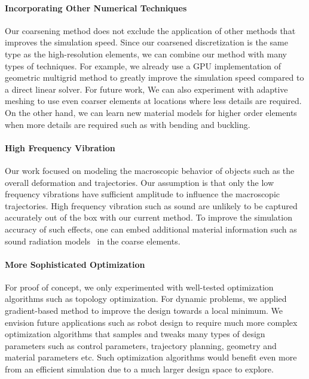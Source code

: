 \paragraph{Incorporating Other Numerical Techniques}
Our coarsening method does not exclude the application of other methods that improves the simulation speed.
Since our coarsened discretization is the same type as the high-resolution elements, we can combine our method with many types of techniques.
For example, we already use a GPU implementation of geometric multigrid method to greatly improve the simulation speed compared to a direct linear solver.
For future work,
We can also experiment with adaptive meshing to use even coarser elements at locations where less details are required. On the other hand, we can learn new material models for higher order elements when more details are required such as with bending and buckling.
\paragraph{High Frequency Vibration}
Our work focused on modeling the macroscopic behavior of objects such as the overall deformation and trajectories.
Our assumption is that only the low frequency vibrations have sufficient amplitude to influence the macroscopic trajectories.
High frequency vibration such as sound are unlikely to be captured accurately out of the box with our current method.
To improve the simulation accuracy of such effects, one can embed additional material information such as sound radiation models~\citep{schweickart2017animating} in the coarse elements.
\paragraph{More Sophisticated Optimization}
For proof of concept, we only experimented with well-tested optimization algorithms such as topology optimization. For dynamic problems, we applied gradient-based method to improve the design towards a local minimum.
We envision future applications such as robot design to require much more complex optimization algorithms that samples and tweaks many types of design parameters such as control parameters, trajectory planning, geometry and material parameters etc.
Such optimization algorithms would benefit even more from an efficient simulation due to a much larger design space to explore.
